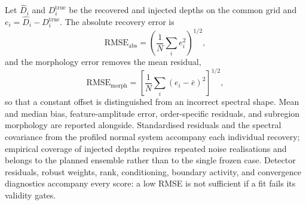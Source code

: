 Let $\widehat D_i$ and $D_i^{\mathrm{true}}$ be the recovered and injected
depths on the common grid and $e_i=\widehat D_i-D_i^{\mathrm{true}}$. The
absolute recovery error is
\begin{equation}
 \mathrm{RMSE}_{\mathrm{abs}}=
 \left(\frac{1}{N}\sum_i e_i^2\right)^{1/2},
 \label{eq:absolute-rmse}
\end{equation}
and the morphology error removes the mean residual,
\begin{equation}
 \mathrm{RMSE}_{\mathrm{morph}}=
 \left[\frac{1}{N}\sum_i(e_i-\bar e)^2\right]^{1/2},
 \label{eq:morphology-rmse}
\end{equation}
so that a constant offset is distinguished from an incorrect spectral
shape. Mean and median bias, feature-amplitude error, order-specific
residuals, and subregion morphology are reported alongside. Standardised
residuals and the spectral covariance from the profiled normal system
accompany each individual recovery; empirical coverage of injected depths
requires repeated noise realisations and belongs to the planned ensemble
rather than to the single frozen case. Detector residuals, robust weights,
rank, conditioning, boundary activity, and convergence diagnostics
accompany every score: a low RMSE is not sufficient if a fit fails its
validity gates.
